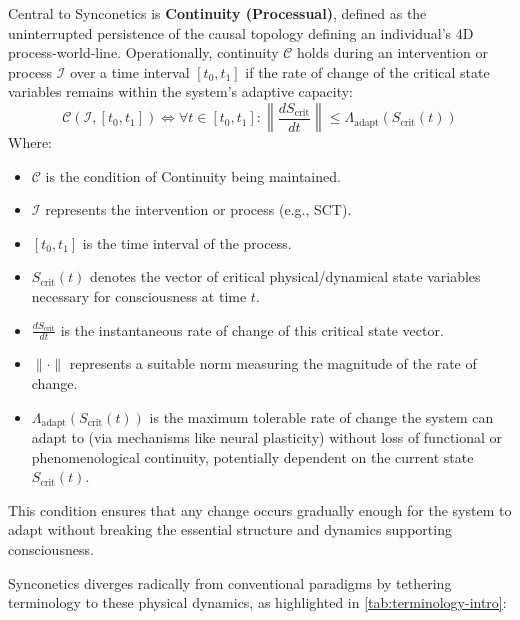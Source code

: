 \documentclass[10pt]{article}
\begin{document}
\begin{sloppypar}
  Central to Synconetics is \textbf{Continuity (Processual)}, defined as the uninterrupted persistence of the causal topology defining an individual’s 4D process-world-line. Operationally, continuity \( \mathcal{C} \) holds during an intervention or process \( \mathcal{I} \) over a time interval \( [t_0, t_1] \) if the rate of change of the critical state variables remains within the system’s adaptive capacity:
  \begin{equation}
    \mathcal{C}(\mathcal{I}, [t_0, t_1]) \iff \forall t \in [t_0, t_1] : \left\| \frac{dS_{\text{crit}}}{dt} \right\| \le \Lambda_{\text{adapt}}(S_{\text{crit}}(t))
    \label{eq:continuity}
  \end{equation}
  Where:
  \begin{itemize}
    \item \( \mathcal{C} \) is the condition of Continuity being maintained.
    \item \( \mathcal{I} \) represents the intervention or process (e.g., SCT).
    \item \( [t_0, t_1] \) is the time interval of the process.
    \item \( S_{\text{crit}}(t) \) denotes the vector of critical physical/dynamical state variables necessary for consciousness at time \( t \).
    \item \( \frac{dS_{\text{crit}}}{dt} \) is the instantaneous rate of change of this critical state vector.
    \item \( \| \cdot \| \) represents a suitable norm measuring the magnitude of the rate of change.
    \item \( \Lambda_{\text{adapt}}(S_{\text{crit}}(t)) \) is the maximum tolerable rate of change the system can adapt to (via mechanisms like neural plasticity) without loss of functional or phenomenological continuity, potentially dependent on the current state \( S_{\text{crit}}(t) \).
  \end{itemize}
  This condition ensures that any change occurs gradually enough for the system to adapt without breaking the essential structure and dynamics supporting consciousness.


  Synconetics diverges radically from conventional paradigms by tethering terminology to these physical dynamics, as highlighted in \autoref{tab:terminology-intro}:



\end{sloppypar}
\end{document}
